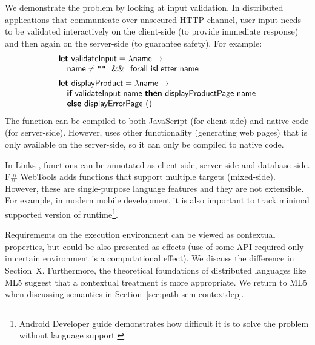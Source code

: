 We demonstrate the problem by looking at input validation. In distributed applications 
that communicate over unsecured HTTP channel, user input needs to be validated interactively
on the client-side (to provide immediate response) and then again on the server-side (to 
guarantee safety). For example:
%
\begin{equation*}
\begin{array}{l}
\kvd{let}~\ident{validateInput} = \lambda \ident{name} \rightarrow\\
\quad\ident{name} \neq \str{""} ~~\&\&~~ \ident{forall~isLetter~name}
\\[0.5em]
\kvd{let}~\ident{displayProduct} = \lambda \ident{name} \rightarrow\\
\quad\kvd{if}~\ident{validateInput name}~\kvd{then}~\ident{displayProductPage~name}\\
\quad\kvd{else}~\ident{displayErrorPage}~() 
\end{array}
\end{equation*}
%
The function  can be compiled to both JavaScript (for client-side) and
native code (for server-side). However,  uses other functionality
(generating web pages) that is only available on the server-side, so it can only be compiled to
native code.

In Links \cite{app-distributed-links}, functions can be annotated as client-side, server-side
and database-side. F\# WebTools \cite{app-fsharp-webtools} adds functions that support multiple
targets (mixed-side). However, these are single-purpose language features and they are not 
extensible. For example, in modern mobile development it is also important to track minimal 
supported version of runtime\footnote{Android Developer guide \cite{app-android-multitarget} 
demonstrates how difficult it is to solve the problem without language support.}. 

Requirements on the execution environment can be viewed as contextual properties, but could be
also presented as effects (use of some API required only in certain environment is a computational
effect). We discuss the difference in Section~X. Furthermore, the theoretical foundations of
distributed languages like ML5 \cite{app-distributed-ml5} suggest that a contextual treatment
is more appropriate. We return to ML5 when discussing semantics in Section~\ref{sec:path-sem-contextdep}.


